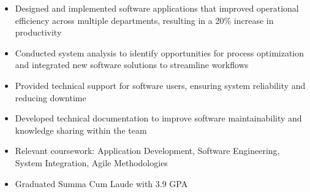 \par\smallskip
\begin{minipage}{13.75cm}
  \begin{minipage}{6.5cm}
    \begin{itemize}
      \item Designed and implemented software applications that improved operational efficiency across multiple departments, resulting in a 20\% increase in productivity
      \item Conducted system analysis to identify opportunities for process optimization and integrated new software solutions to streamline workflows
    \end{itemize}
  \end{minipage}
  \hfill
  \begin{minipage}{6.5cm}
    \begin{itemize}
      \item Provided technical support for software users, ensuring system reliability and reducing downtime
      \item Developed technical documentation to improve software maintainability and knowledge sharing within the team
    \end{itemize}
  \end{minipage}
\end{minipage}

\par\bigskip
{}
\begin{itemize}
  \item Relevant coursework: Application Development, Software Engineering, System Integration, Agile Methodologies
\end{itemize}
\divider

\begin{itemize}
  \item Graduated Summa Cum Laude with 3.9 GPA
\end{itemize}



